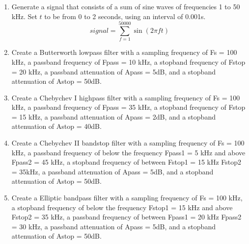 \documentclass[12pt]{article}
\begin{document}
\begin{enumerate}
\item  Generate a signal that consists of a sum of sine waves of frequencies 1 to 50 kHz. Set $t$ to be from 0 to 2 seconds, using an interval of 0.001s.
$$signal = \sum_{f = 1}^{50000}\sin(2\pi ft)$$
\item Create a Butterworth lowpass filter with a sampling frequency of Fs = 100 kHz, a passband frequency of Fpass = 10 kHz, a stopband frequency of Fstop = 20 kHz, a passband attenuation of Apass = 5dB, and a stopband attenuation of Astop = 50dB.
\item Create a Chebychev I highpass filter with a sampling frequency of Fs = 100 kHz, a passband frequency of Fpass = 35 kHz, a stopband frequency of Fstop = 15 kHz, a passband attenuation of Apass = 2dB, and a stopband attenuation of Astop = 40dB.
\item Create a Chebychev II bandstop filter with a sampling frequency of Fs = 100 kHz, a passband frequency of below the frequency Fpass1 = 5 kHz and above Fpass2 = 45 kHz, a stopband frequency of between Fstop1 = 15 kHz Fstop2 = 35kHz, a passband attenuation of Apass = 5dB, and a stopband attenuation of Astop = 50dB.
\item Create a Elliptic bandpass filter with a sampling frequency of Fs = 100 kHz, a stopband frequency of below the frequency Fstop1 = 15 kHz and above Fstop2 = 35 kHz, a passband frequency of between Fpass1 = 20 kHz Fpass2 = 30 kHz, a passband attenuation of Apass = 5dB, and a stopband attenuation of Astop = 50dB.
\end{enumerate}
\end{document}
